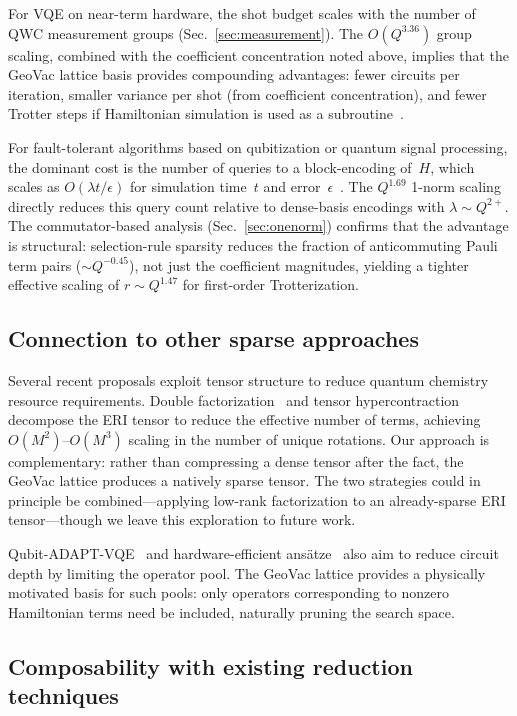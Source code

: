 \documentclass[aps,pra,twocolumn,superscriptaddress,longbibliography]{revtex4-2}
\begin{document}
For VQE on near-term hardware, the shot budget scales with the number
of QWC measurement groups (Sec.~\ref{sec:measurement}).  The
$O(Q^{3.36})$ group scaling, combined with the coefficient
concentration noted above, implies that the GeoVac lattice basis
provides compounding advantages: fewer circuits per iteration, smaller
variance per shot (from coefficient concentration), and fewer Trotter
steps if Hamiltonian simulation is used as a
subroutine~\cite{verteletskyi2020}.

For fault-tolerant algorithms based on qubitization or quantum signal
processing, the dominant cost is the number of queries to a
block-encoding of~$H$, which scales as $O(\lambda t / \epsilon)$ for
simulation time~$t$ and error~$\epsilon$~\cite{childs2021}.  The
$Q^{1.69}$ 1-norm scaling directly reduces this query count relative
to dense-basis encodings with $\lambda \sim Q^{2+}$.
The commutator-based analysis (Sec.~\ref{sec:onenorm}) confirms that
the advantage is structural: selection-rule sparsity reduces the
fraction of anticommuting Pauli term pairs ($\sim Q^{-0.45}$), not
just the coefficient magnitudes, yielding a tighter effective scaling
of $r \sim Q^{1.47}$ for first-order Trotterization.

\subsection{Connection to other sparse approaches}
\label{sec:related}

Several recent proposals exploit tensor structure to reduce quantum
chemistry resource requirements.  Double factorization~\cite{motta2021}
and tensor hypercontraction~\cite{lee2021} decompose the ERI tensor to
reduce the effective number of terms, achieving $O(M^2)$--$O(M^3)$ scaling
in the number of unique rotations.  Our approach is complementary: rather
than compressing a dense tensor after the fact, the GeoVac lattice
produces a natively sparse tensor.  The two strategies could in principle
be combined---applying low-rank factorization to an already-sparse ERI
tensor---though we leave this exploration to future work.

Qubit-ADAPT-VQE~\cite{tang2021} and hardware-efficient
ans\"atze~\cite{kandala2017} also aim to reduce circuit depth by limiting
the operator pool.  The GeoVac lattice provides a physically motivated
basis for such pools: only operators corresponding to nonzero Hamiltonian
terms need be included, naturally pruning the search space.

\subsection{Composability with existing reduction techniques}
\label{sec:composability}
\end{document}
